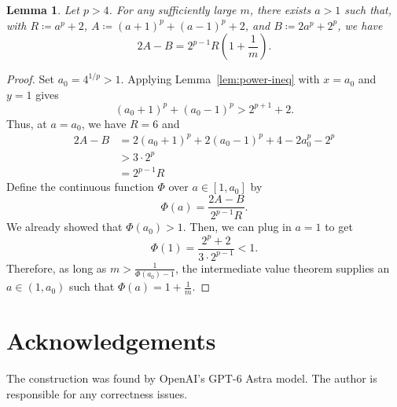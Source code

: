 \documentclass[11pt,reqno]{amsart}
\theoremstyle{plain}
\newtheorem{lemma}[theorem]{Lemma}
\theoremstyle{definition}
\theoremstyle{remark}
\numberwithin{equation}{section}
\begin{document}
\begin{lemma}
Let $p>4$. For any sufficiently large $m$, there exists $a>1$ such that, with $R\coloneqq a^p+2$, $A\coloneq (a+1)^p+(a-1)^p+2$, and $B\coloneq 2a^p+2^p$, we have
\[2A-B=2^{p-1}R\left(1+\frac{1}{m}\right).\]
\end{lemma}

\begin{proof}
Set $a_0=4^{1/p}>1$. Applying Lemma~\ref{lem:power-ineq} with
$x=a_0$ and $y=1$ gives
\[(a_0+1)^p+(a_0-1)^p>2^{p+1}+2.\]
Thus, at $a=a_0$, we have $R=6$ and
\begin{align*}
    2A-B &= 2(a_0+1)^p+2(a_0-1)^p+4-2a_0^p-2^p\\
    &> 3\cdot 2^p\\
    &= 2^{p-1}R
\end{align*}
Define the continuous function $\Phi$ over $a\in[1,a_0]$ by
\[\Phi(a)=\frac{2A-B}{2^{p-1}R}.\]
We already showed that $\Phi(a_0)>1$. Then, we can plug in $a=1$ to get
\[\Phi(1)=\frac{2^p+2}{3\cdot2^{p-1}}<1.\]
Therefore, as long as $m>\frac{1}{\Phi(a_0)-1}$, the intermediate value theorem supplies an $a\in(1,a_0)$ such that
$\Phi(a)=1+\frac{1}{m}$.
\end{proof}

\section{Acknowledgements}
The construction was found by OpenAI's GPT-6 Astra model. The author is responsible for any correctness issues. 



\end{document}
